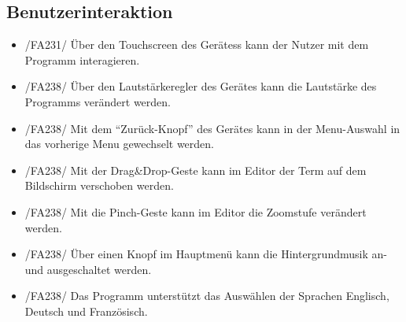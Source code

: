 \subsection{Benutzerinteraktion}

\begin{itemize}
\item /FA231/ Über den Touchscreen des Gerätess kann der Nutzer mit dem Programm interagieren.
\item /FA238/ Über den Lautstärkeregler des Gerätes kann die Lautstärke des Programms verändert werden.
\item /FA238/ Mit dem "`Zurück-Knopf"' des Gerätes kann in der Menu-Auswahl in das vorherige Menu gewechselt werden.
\item /FA238/ Mit der Drag\&Drop-Geste kann im Editor der Term auf dem Bildschirm verschoben werden.
\item /FA238/ Mit die Pinch-Geste kann im Editor die Zoomstufe verändert werden.
\item /FA238/ Über einen Knopf im Hauptmenü kann die Hintergrundmusik an- und ausgeschaltet werden.
\item /FA238/ Das Programm unterstützt das Auswählen der Sprachen Englisch, Deutsch und Französisch.
\end{itemize}